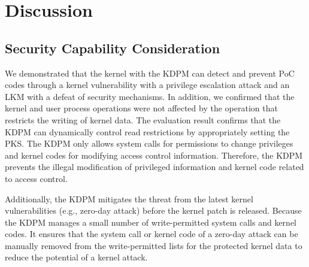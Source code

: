 \section{Discussion}  \label{section:discussion}
\subsection{Security Capability Consideration}
We demonstrated that the kernel with the KDPM can detect
and prevent PoC codes through a kernel vulnerability with a privilege
escalation attack and an LKM with a defeat of security mechanisms.
%
%
%
In addition, we confirmed that the kernel and user process operations were not
affected by the operation that restricts the writing of kernel data. 
%
The evaluation result confirms that the KDPM can
dynamically control read restrictions by appropriately setting the PKS.
%
The KDPM only allows system calls for permissions to change privileges
and kernel codes for modifying access control information.
%
Therefore, the KDPM prevents the illegal modification of privileged information
and kernel code related to access control.

%
Additionally, the KDPM mitigates the threat from the latest kernel
vulnerabilities (e.g., zero-day attack) before the kernel patch is released.
%
Because the KDPM manages a small number of write-permitted system calls and
kernel codes. It ensures that the system call or kernel code
of a zero-day attack can be manually removed from the write-permitted lists
for the protected kernel data to reduce the potential of a kernel attack.

